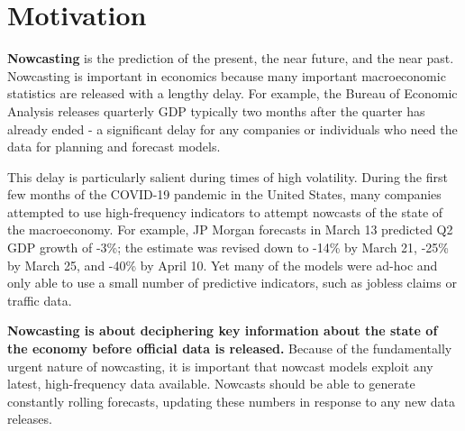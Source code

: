 \documentclass[11pt, letterpaper]{article}\usepackage[]{graphicx}\usepackage[]{color}
\begin{document}





\section{Motivation}
\textbf{Nowcasting} is the prediction of the present, the near future, and the near past. Nowcasting is important in economics because many important macroeconomic statistics are released with a lengthy delay. For example, the Bureau of Economic Analysis releases quarterly GDP typically two months after the quarter has already ended - a significant delay for any companies or individuals who need the data for planning and forecast models.

This delay is particularly salient during times of high volatility. During the first few months of the COVID-19 pandemic in the United States, many companies attempted to use high-frequency indicators to attempt nowcasts of the state of the macroeconomy. For example, JP Morgan forecasts in March 13 predicted Q2 GDP growth of -3\%; the estimate was revised down to -14\% by March 21, -25\% by March 25, and -40\% by April 10. Yet many of the models were ad-hoc and only able to use a small number of predictive indicators, such as jobless claims or traffic data.

\textbf{Nowcasting is about deciphering key information about the state of the economy before official data is released.} Because of the fundamentally urgent nature of nowcasting, it is important that nowcast models exploit any latest, high-frequency data available. Nowcasts should be able to generate constantly rolling forecasts, updating these numbers in response to any new data releases.
\end{document}
